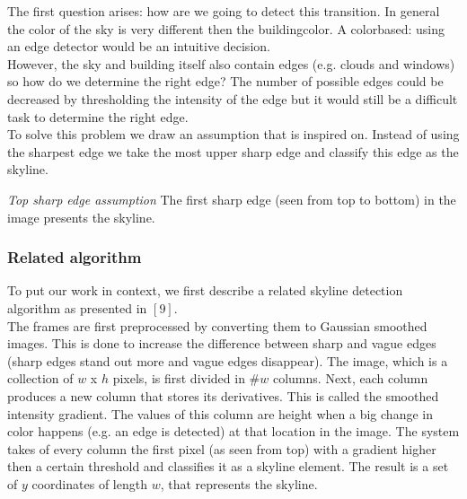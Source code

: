 \documentclass[10pt]{article}
\begin{document}
The first question arises: how are we going to detect this transition. In
general the color of the sky is very different then the buildingcolor. A
colorbased: using an edge detector would be an intuitive decision.\\
However, the sky and building itself also contain edges (e.g. clouds and 
windows) so how do we determine the right edge?
The number of possible edges could be decreased by thresholding the intensity of
the edge but it would still be a difficult task to determine the right edge.\\

To solve this problem we draw an assumption that is inspired on.
Instead of using the sharpest edge we take the most upper sharp edge and
classify this edge as the skyline.

\textit{Top sharp edge assumption}
The first sharp edge (seen from top to bottom) in the image 
presents the skyline.




\subsubsection{Related algorithm}
To put our work in context, we first describe
a related skyline detection algorithm as presented in %
$[9]$.\\

The frames are first preprocessed by converting them to Gaussian smoothed images.
This is done to increase the difference between sharp and vague edges (sharp
edges stand out more and vague edges disappear).
The image, which is a collection of $w$ x $h$ pixels, is first divided in #$w$ columns.
Next, each column produces a new column that stores its derivatives. This is called the smoothed intensity gradient.
The values of this column are height when a big change in color happens (e.g. an edge is detected) at
that location in the image. 
The system takes of every column the first pixel (as seen from top) with a
gradient higher then a certain threshold and classifies it as a skyline
element.  
The result is a set of $y$ coordinates of length $w$, that represents the skyline.

\end{document}
